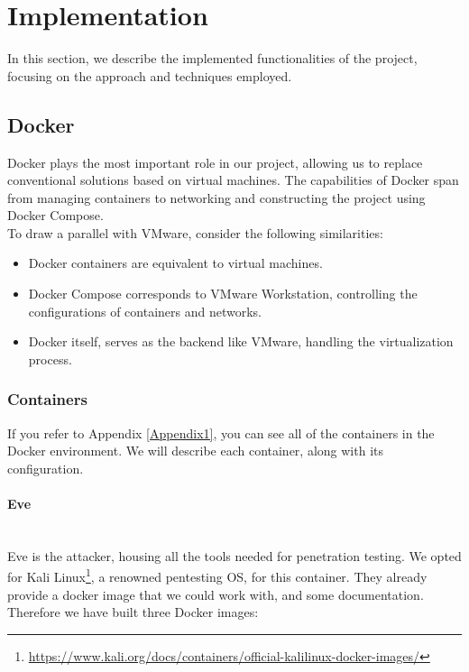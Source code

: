 \documentclass[a4paper,11pt,singlespacing]{article}
\begin{document}
\section{Implementation}
In this section, we describe the implemented functionalities of the project, focusing on the approach and techniques employed.

\subsection{Docker}
Docker plays the most important role in our project, allowing us to replace conventional solutions based on virtual machines. The capabilities of Docker span from managing containers to networking and constructing the project using Docker Compose.\\

To draw a parallel with VMware, consider the following similarities:
\begin{itemize}
    \item Docker containers are equivalent to virtual machines.
    \item Docker Compose corresponds to VMware Workstation, controlling the configurations of containers and networks.
    \item Docker itself, serves as the backend like VMware, handling the virtualization process.
\end{itemize}

\subsubsection{Containers}\label{containers}   
If you refer to Appendix \ref{Appendix1}, you can see all of the containers in the Docker environment. We will describe each container, along with its configuration.

\paragraph{Eve}
\leavevmode\\
Eve is the attacker, housing all the tools needed for penetration testing. We opted for Kali Linux\footnote{\url{https://www.kali.org/docs/containers/official-kalilinux-docker-images/}}, a renowned pentesting OS, for this container. They already provide a docker image that we could work with, and some documentation. Therefore we have built three Docker images:
\end{document}
